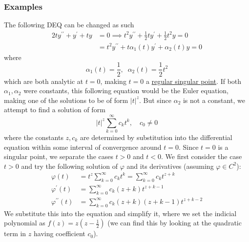 \documentclass{article}
\newcounter{example}[section]
\begin{document}
    \subsubsection{Examples}

      \begin{example}
        \label{ex:converting-to-standard-form-at-a-singular-point}
      The following DEQ can be changed as such
      \begin{align*}
          2ty^{\prime\prime} + y^\prime + ty & = 0 \implies t^2 y^{\prime\prime} + \frac{1}{2} ty^\prime + \frac{1}{2} t^2 y = 0 \\
          & = t^2 y^{\prime\prime} + t \alpha_1 (t) y^\prime + \alpha_2 (t) y = 0
      \end{align*}
      where
      \begin{equation}
        \alpha_1 (t) = \frac{1}{2}, \;\; \alpha_2 (t) = \frac{1}{2} t^2
      \end{equation}
      which are both analytic at $t = 0$, making $t = 0$ a \hyperref[def:regular-singular-point]{regular singular point}. If both $\alpha_1, \alpha_2$ were constants, this following equation would be the Euler equation, making one of the solutions to be of form $|t|^z$. But since $\alpha_2$ is not a constant, we attempt to find a solution of form 
      \begin{equation}
        |t|^z \sum_{k=0}^\infty c_k t^k, \quad c_0 \neq 0
      \end{equation}
      where the constants $z, c_k$ are determined by substitution into the differential equation within some interval of convergence around $t = 0$. Since $t = 0$ is a singular point, we separate the cases $t>0$ and $t<0$. We first consider the case $t>0$ and try the following solution of $\varphi$ and its derivatives (assuming $\varphi \in C^2$): 
      \begin{align*}
          \varphi (t) & = t^z \sum_{k=0}^\infty c_k t^k = \sum_{k=0}^\infty c_k t^{z+k} \\
          \varphi^\prime (t) & = \sum_{k=0}^\infty c_k (z+k) t^{z+k-1} \\
          \varphi^{\prime\prime} (t) & = \sum_{k=0}^\infty c_k (z+k)(z+k-1) t^{z+k-2} 
      \end{align*}
      We substitute this into the equation and simplify it, where we set the indicial polynomial as $f(z) = z (z - \frac{1}{2})$ (we can find this by looking at the quadratic term in $z$ having coefficient $c_0$). 
      \begin{align*}

\end{align*}
\end{example}
\end{document}
